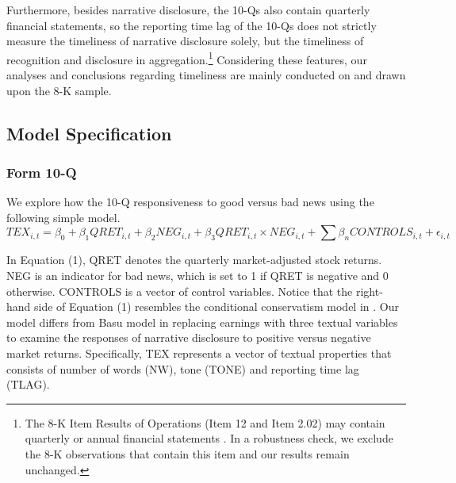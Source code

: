 \documentclass[letterpaper,12pt]{article}
\begin{document}
\begin{spacing}{1.5}
Furthermore, besides narrative disclosure, the 10-Qs also contain quarterly financial statements, so the reporting time lag of the 10-Qs does not strictly measure the timeliness of narrative disclosure solely, but the timeliness of recognition and disclosure in aggregation.\footnote{The 8-K Item Results of Operations (Item 12 and Item 2.02) may contain quarterly or annual financial statements \cite{segalAreManagersStrategic2016}. In a robustness check, we exclude the 8-K observations that contain this item and our results remain unchanged.} Considering these features, our analyses and conclusions regarding timeliness are mainly conducted on and drawn upon the 8-K sample.

\subsection{Model Specification} \label{sec3.3}
\subsubsection{Form 10-Q} \label{sec3.3.1}
\noindent  We explore how the 10-Q responsiveness to good versus bad news using the following simple model. 
\begin{equation} \label{eq1}
TEX_{i,t}=\beta_0+\beta_1QRET_{i,t}+\beta_2NEG_{i,t}+\beta_3QRET_{i,t}\times NEG_{i,t}+\sum\beta_nCONTROLS_{i,t}+\epsilon_{i,t}
\end{equation}

In Equation (1), QRET denotes the quarterly market-adjusted stock returns. NEG is an indicator for bad news, which is set to 1 if QRET is negative and 0 otherwise. CONTROLS is a vector of control variables. Notice that the right-hand side of Equation (1) resembles the conditional conservatism model in . Our model differs from Basu model in replacing earnings with three textual variables to examine the responses of narrative disclosure to positive versus negative market returns. Specifically, TEX represents a vector of textual properties that consists of number of words (NW), tone (TONE) and reporting time lag (TLAG). 


\end{spacing}
\end{document}
